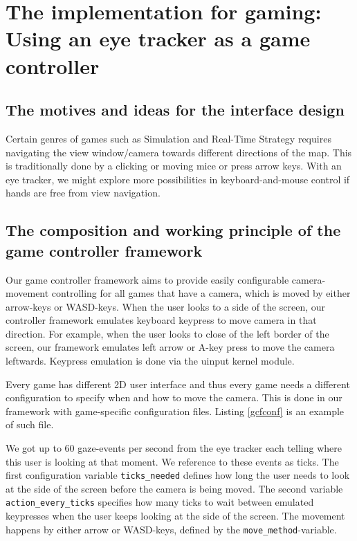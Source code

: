 \documentclass[english]{tktltiki}
\begin{document}



\section{The implementation for gaming: Using an eye tracker as a game controller}


\subsection{The motives and ideas for the interface design}

Certain genres of games such as Simulation and Real-Time Strategy requires navigating the view window/camera towards different directions of the map. This is traditionally done by a clicking or moving mice or press arrow keys. With an eye tracker, we might explore more possibilities in keyboard-and-mouse control if hands are free from view navigation. 


\subsection{The composition and working principle of the game controller framework}

Our game controller framework aims to provide easily configurable camera-movement controlling for all games that have a camera, which is moved by either arrow-keys or WASD-keys. When the user looks to a side of the screen, our controller framework emulates keyboard keypress to move camera in that direction. For example, when the user looks to close of the left border of the screen, our framework emulates left arrow or A-key press to move the camera leftwards. Keypress emulation is done via the uinput kernel module.

Every game has different 2D user interface and thus every game needs a different configuration to specify when and how to move the camera. This is done in our framework with game-specific configuration files. Listing \ref{gcfconf} is an example of such file.

We got up to 60 gaze-events per second from the eye tracker each telling where this user is looking at that moment. We reference to these events as ticks. The first configuration variable \verb|ticks_needed| defines how long the user needs to look at the side of the screen before the camera is being moved. The second variable \verb|action_every_ticks| specifies how many ticks to wait between emulated keypresses when the user keeps looking at the side of the screen. The movement happens by either arrow or WASD-keys, defined by the \verb|move_method|-variable.
\end{document}
